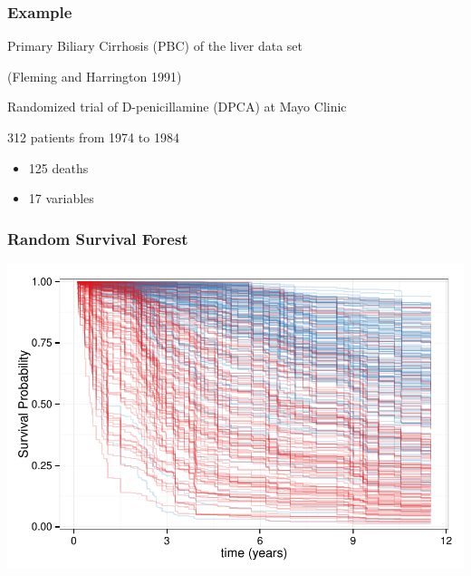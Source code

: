 \documentclass[xcolor=svgnames]{beamer}\usepackage[]{graphicx}\usepackage[]{color}
\newenvironment{knitrout}{}{} %
\begin{document}
\begin{frame}
\frametitle{Example}
Primary Biliary Cirrhosis (PBC) of the liver data set

(Fleming and Harrington 1991)

Randomized  trial of D-penicillamine (DPCA) at Mayo Clinic

312 patients from 1974 to 1984
\begin{itemize}
\item 125 deaths
\item 17 variables
\end{itemize}

\end{frame}
\begin{frame}
\frametitle{Random Survival Forest}

\begin{knitrout}\footnotesize
{}\color{fgcolor}

{\centering \includegraphics[width=.9\linewidth]{figures/pbc-forest-1} 

}



\end{knitrout}
\end{frame}
\end{document}
